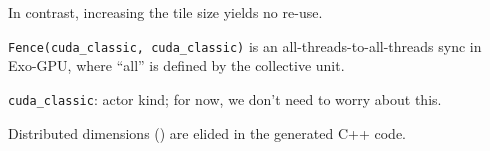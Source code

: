 In contrast, increasing the  tile size yields no re-use.


\newpage
{}



\texttt{Fence(cuda\_classic, cuda\_classic)} is an all-threads-to-all-threads sync in Exo-GPU, where ``all'' is defined by the collective unit.

\texttt{cuda\_classic}: actor kind; for now, we don't need to worry about this.

\newpage
{}



\newpage
{}



\newpage
{}



\newpage
{}



\newpage
{}



\newpage
{}



\newpage
{}



\newpage
{}


\newpage
{}

\begin{minipage}[t]{0.48\textwidth}\fixminipage
{}


\end{minipage}
\hfill
\begin{minipage}[t]{0.48\textwidth}\fixminipage
{}



\vspace{4mm}
Distributed dimensions () are elided in the generated C++ code.
\end{minipage}

\newpage
{}

